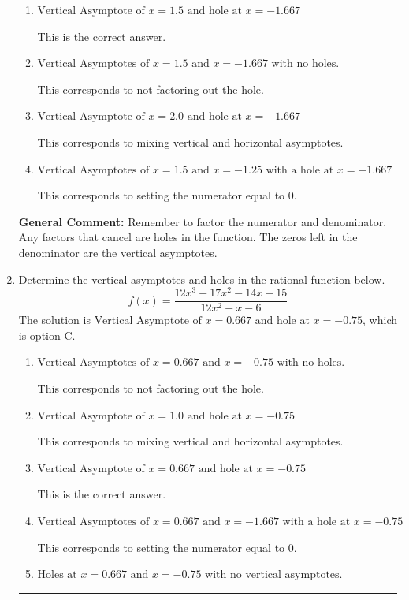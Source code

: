 \documentclass{extbook}[14pt]
\newcommand{\litem}[1]{\item #1

\rule{\textwidth}{0.4pt}}
\begin{document}
\begin{enumerate}
{\begin{enumerate}[label=\Alph*.]
This corresponds to considering where the denominator is equal to 0 as holes.
\item \( \text{Vertical Asymptote of } x = 1.5 \text{ and hole at } x = -1.667 \)

This is the correct answer.
\item \( \text{Vertical Asymptotes of } x = 1.5 \text{ and } x = -1.667 \text{ with no holes.} \)

This corresponds to not factoring out the hole.
\item \( \text{Vertical Asymptote of } x = 2.0 \text{ and hole at } x = -1.667 \)

This corresponds to mixing vertical and horizontal asymptotes.
\item \( \text{Vertical Asymptotes of } x = 1.5 \text{ and } x = -1.25 \text{ with a hole at } x = -1.667 \)

This corresponds to setting the numerator equal to 0.
\end{enumerate}

\textbf{General Comment:} Remember to factor the numerator and denominator. Any factors that cancel are holes in the function. The zeros left in the denominator are the vertical asymptotes.
}
\litem{
Determine the vertical asymptotes and holes in the rational function below.
\[ f(x) = \frac{12x^{3} +17 x^{2} -14 x -15}{12x^{2} +x -6} \]The solution is \( \text{Vertical Asymptote of } x = 0.667 \text{ and hole at } x = -0.75 \), which is option C.\begin{enumerate}[label=\Alph*.]
\item \( \text{Vertical Asymptotes of } x = 0.667 \text{ and } x = -0.75 \text{ with no holes.} \)

This corresponds to not factoring out the hole.
\item \( \text{Vertical Asymptote of } x = 1.0 \text{ and hole at } x = -0.75 \)

This corresponds to mixing vertical and horizontal asymptotes.
\item \( \text{Vertical Asymptote of } x = 0.667 \text{ and hole at } x = -0.75 \)

This is the correct answer.
\item \( \text{Vertical Asymptotes of } x = 0.667 \text{ and } x = -1.667 \text{ with a hole at } x = -0.75 \)

This corresponds to setting the numerator equal to 0.
\item \( \text{Holes at } x = 0.667 \text{ and } x = -0.75 \text{ with no vertical asymptotes.} \)


\end{enumerate}}
\end{enumerate}
\end{document}
